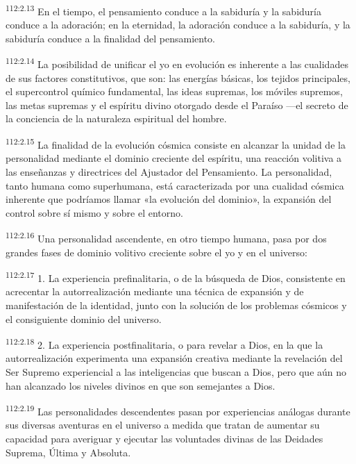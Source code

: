\par
\textsuperscript{112:2.13} En el tiempo, el pensamiento conduce a la sabiduría y la sabiduría conduce a la adoración; en la eternidad, la adoración conduce a la sabiduría, y la sabiduría conduce a la finalidad del pensamiento.

\par
\textsuperscript{112:2.14} La posibilidad de unificar el yo en evolución es inherente a las cualidades de sus factores constitutivos, que son: las energías básicas, los tejidos principales, el supercontrol químico fundamental, las ideas supremas, los móviles supremos, las metas supremas y el espíritu divino otorgado desde el Paraíso ---el secreto de la conciencia de la naturaleza espiritual del hombre.

\par
\textsuperscript{112:2.15} La finalidad de la evolución cósmica consiste en alcanzar la unidad de la personalidad mediante el dominio creciente del espíritu, una reacción volitiva a las enseñanzas y directrices del Ajustador del Pensamiento. La personalidad, tanto humana como superhumana, está caracterizada por una cualidad cósmica inherente que podríamos llamar «la evolución del dominio», la expansión del control sobre sí mismo y sobre el entorno.

\par
\textsuperscript{112:2.16} Una personalidad ascendente, en otro tiempo humana, pasa por dos grandes fases de dominio volitivo creciente sobre el yo y en el universo:

\par
\textsuperscript{112:2.17} 1. La experiencia prefinalitaria, o de la búsqueda de Dios, consistente en acrecentar la autorrealización mediante una técnica de expansión y de manifestación de la identidad, junto con la solución de los problemas cósmicos y el consiguiente dominio del universo.

\par
\textsuperscript{112:2.18} 2. La experiencia postfinalitaria, o para revelar a Dios, en la que la autorrealización experimenta una expansión creativa mediante la revelación del Ser Supremo experiencial a las inteligencias que buscan a Dios, pero que aún no han alcanzado los niveles divinos en que son semejantes a Dios.

\par
\textsuperscript{112:2.19} Las personalidades descendentes pasan por experiencias análogas durante sus diversas aventuras en el universo a medida que tratan de aumentar su capacidad para averiguar y ejecutar las voluntades divinas de las Deidades Suprema, Última y Absoluta.

